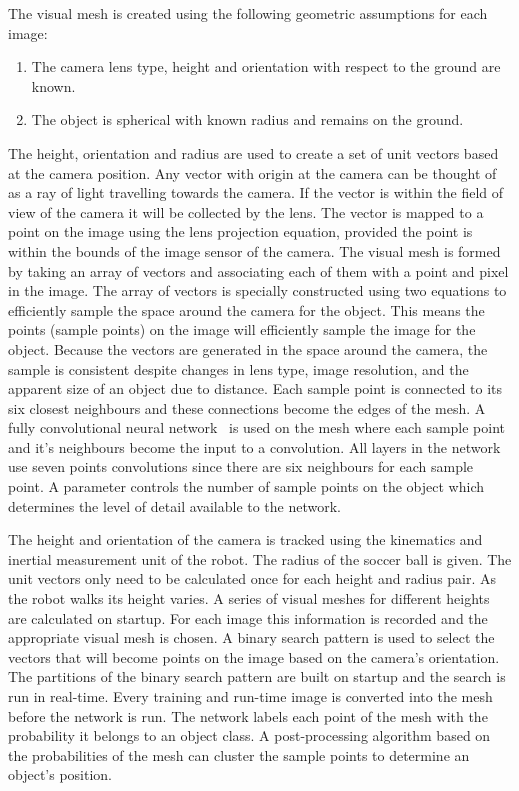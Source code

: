 \documentclass{llncs}
\begin{document}
The visual mesh is created using the following geometric assumptions for each image:
\begin{enumerate}
    \item The camera lens type, height and orientation with respect to the ground are known. 
    \item The object is spherical with known radius and remains on the ground.
\end{enumerate}

The height, orientation and radius are used to create a set of unit vectors based at the camera position. Any vector with origin at the camera can be thought of as a ray of light travelling towards the camera. If the vector is within the field of view of the camera it will be collected by the lens. The vector is mapped to a point on the image using the lens projection equation, provided the point is within the bounds of the image sensor of the camera. The visual mesh is formed by taking an array of vectors and associating each of them with a point and pixel in the image. The array of vectors is specially constructed using two equations to efficiently sample the space around the camera for the object. This means the points (sample points) on the image will efficiently sample the image for the object. Because the vectors are generated in the space around the camera, the sample is consistent despite changes in lens type, image resolution, and the apparent size of an object due to distance. Each sample point is connected to its six closest neighbours and these connections become the edges of the mesh. A fully convolutional neural network~\cite{ShelmarLong2017} is used on the mesh where each sample point and it's neighbours become the input to a convolution. All layers in the network use seven points convolutions since there are six neighbours for each sample point. A parameter controls the number of sample points on the object which determines the level of detail available to the network. 

The height and orientation of the camera is tracked using the kinematics and inertial measurement unit of the robot. The radius of the soccer ball is given. The unit vectors only need to be calculated once for each height and radius pair. As the robot walks its height varies. A series of visual meshes for different heights are calculated on startup. For each image this information is recorded and the appropriate visual mesh is chosen. A binary search pattern is used to select the vectors that will become points on the image based on the camera's orientation. The partitions of the binary search pattern are built on startup and the search is run in real-time. Every training and run-time image is converted into the mesh before the network is run. The network labels each point of the mesh with the probability it belongs to an object class. A post-processing algorithm based on the probabilities of the mesh can cluster the sample points to determine an object's position.
\end{document}

